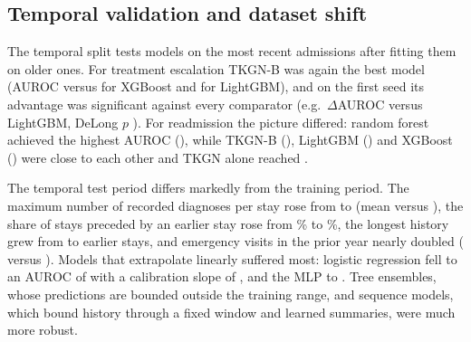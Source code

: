 \begin{table}[t]
  \centering
  \caption{TKGN-B compared with each model. $\Delta$AUROC and its 95\%
  patient-clustered bootstrap CI refer to the first grouped test set;
  $p_\text{DeLong}$: DeLong test on the same set; Wins: repeats (of five)
  in which TKGN-B had the higher test AUROC; $p_\text{temp}$: DeLong test on
  the temporal test set (first seed). Positive values favour TKGN-B.}
  \label{tab:significance}
  \scriptsize
  \setlength{\tabcolsep}{3pt}
  
\end{table}

\subsection{Temporal validation and dataset shift}
The temporal split tests models on the most recent admissions after
fitting them on older ones. For treatment escalation TKGN-B was again the
best model (AUROC \AucEscTmpTKGNB{} versus \AucEscTmpXGB{} for XGBoost and
\AucEscTmpLGBM{} for LightGBM), and on the first seed its advantage was
significant against every comparator (e.g.\ $\Delta$AUROC \DaucTmpEscLGBM{}
versus LightGBM, DeLong $p$ \PDelongTmpEscLGBM{}). For readmission the
picture differed: random forest achieved the highest AUROC
(\AucReadmitTmpRF{}), while TKGN-B (\AucReadmitTmpTKGNB{}), LightGBM
(\AucReadmitTmpLGBM{}) and XGBoost (\AucReadmitTmpXGB{}) were close to each
other and TKGN alone reached \AucReadmitTmpTKGN{}.

The temporal test period differs markedly from the training period. The
maximum number of recorded diagnoses per stay rose from \ShiftTrainDxMax{}
to \ShiftTestDxMax{} (mean \ShiftTrainDxMean{} versus \ShiftTestDxMean{}),
the share of stays preceded by an earlier stay rose from
\ShiftTrainHist\% to \ShiftTestHist\%, the longest history grew from
\ShiftTrainMaxPrior{} to \ShiftTestMaxPrior{} earlier stays, and emergency
visits in the prior year nearly doubled (\ShiftTrainEmerg{} versus
\ShiftTestEmerg{}). Models that extrapolate linearly suffered most:
logistic regression fell to an AUROC of \AucReadmitTmpLR{} with a
calibration slope of \SlopeReadmitTmpLR{}, and the MLP to
\AucReadmitTmpMLP{}. Tree ensembles, whose predictions are bounded outside
the training range, and sequence models, which bound history through a fixed
window and learned summaries, were much more robust.

